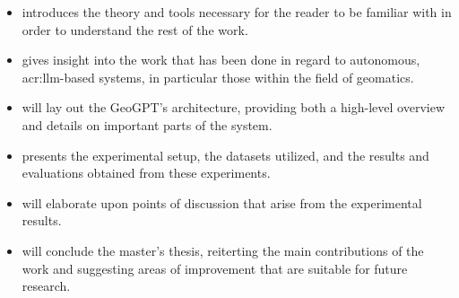 \begin{itemize}
    \item {} introduces the theory and tools necessary for the reader to be familiar with in order to understand the rest of the work.
    \item {} gives insight into the work that has been done in regard to autonomous, \acrshort{acr:llm}-based systems, in particular those within the field of geomatics.
    \item {} will lay out the GeoGPT's architecture, providing both a high-level overview and details on important parts of the system.
    \item {} presents the experimental setup, the datasets utilized, and the results and evaluations obtained from these experiments.
    \item {} will elaborate upon points of discussion that arise from the experimental results.
    \item {} will conclude the master's thesis, reiterting the main contributions of the work and suggesting areas of improvement that are suitable for future research.
\end{itemize}


\glsresetall